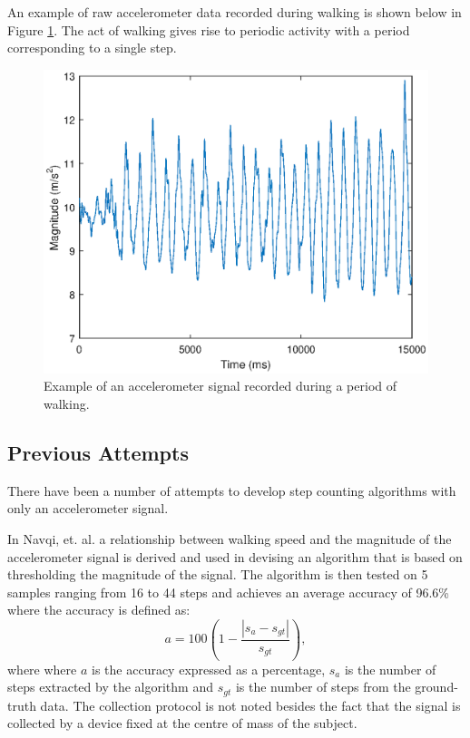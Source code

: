                An example of raw accelerometer data recorded during walking is shown below in Figure \ref{img_accel_ex}. The act of walking gives rise to periodic activity with a period corresponding to a single step. 

                \begin{figure}[h]
                    \includegraphics[width=\textwidth]{Images/accel_signal.eps}
                    \centering
                    \caption{Example of an accelerometer signal recorded during a period of walking.}
                    \label{img_accel_ex}
                \end{figure}

            \subsection{Previous Attempts}

                There have been a number of attempts to develop step counting algorithms with only an accelerometer signal.

                In Navqi, et. al. \cite{navqi} a relationship between walking speed and the magnitude of the accelerometer signal is derived and used in devising an algorithm that is based on thresholding the magnitude of the signal. The algorithm is then tested on 5 samples ranging from 16 to 44 steps and achieves an average accuracy of 96.6\% where the accuracy is defined as:
                \begin{equation}
                    a = 100(1 - \frac{|s_{a}-s_{gt}|}{s_{gt}}),
                \end{equation}
                where where $a$ is the accuracy expressed as a percentage, $s_{a}$ is the number of steps extracted by the algorithm and $s_{gt}$ is the number of steps from the ground-truth data. The collection protocol is not noted besides the fact that the signal is collected by a device fixed at the centre of mass of the subject.

